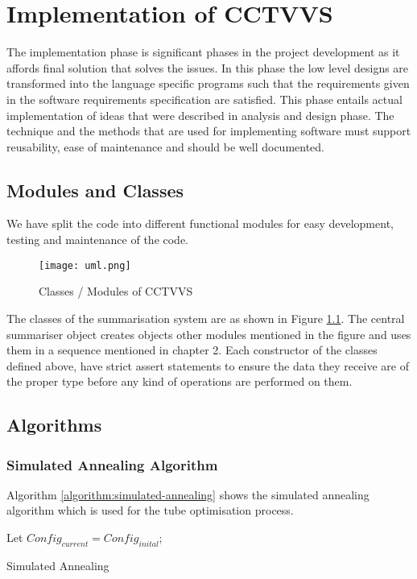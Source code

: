 \chapter{Implementation of CCTVVS}

The implementation phase is significant phases in the project development as it
affords final solution that solves the issues. In this phase the low level
designs are transformed into the language specific programs such that the
requirements given in the software requirements specification are satisfied.
This phase entails actual implementation of ideas that were described in
analysis and design phase. The technique and the methods that are used for
implementing software must support reusability, ease of maintenance and should
be well documented.

\section{Modules and Classes}
We have split the code into different functional modules for easy development,
testing and maintenance of the code.

\begin{figure}[H]
    \centering
    \texttt{[image: uml.png]}
    \caption{Classes / Modules of CCTVVS}
    \label{img:uml}
\end{figure}

The classes of the summarisation system are as shown in Figure \ref{img:uml}.
The central summariser object creates objects other modules mentioned in the
figure and uses them in a sequence mentioned in chapter 2. Each constructor of
the classes defined above, have strict assert statements to ensure the data they
receive are of the proper type before any kind of operations are performed on
them.

\section{Algorithms}

    \subsection{Simulated Annealing Algorithm}
    Algorithm \ref{algorithm:simulated-annealing} shows the simulated annealing algorithm
    which is used for the tube optimisation process.

    \begin{algorithm}
        \SetAlgoLined
        Let \(Config_{current} = Config_{inital}\);
        \caption{Simulated Annealing}
        \label{algorithm:simulated-annealing}
    \end{algorithm}

